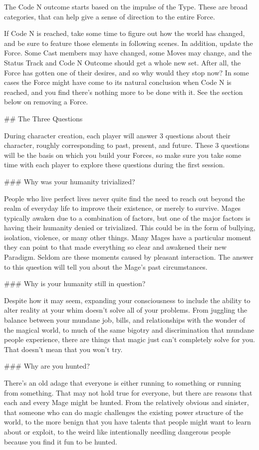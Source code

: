 \documentclass[
  oneside,
  statementpaper,
  9pt]{memoir}
\begin{document}
\begin{MC}
The Code N outcome starts based on the impulse of the Type. These are broad categories, that can help give a sense of direction to the entire Force.

If Code N is reached, take some time to figure out how the world has changed, and be sure to feature those elements in following scenes. In addition, update the Force. Some Cast members may have changed, some Moves may change, and the Status Track and Code N Outcome should get a whole new set. After all, the Force has gotten one of their desires, and so why would they stop now? In some cases the Force might have come to its natural conclusion when Code N is reached, and you find there’s nothing more to be done with it. See the section below on removing a Force.

## The Three Questions

During character creation, each player will answer 3 questions about their character, roughly corresponding to past, present, and future. These 3 questions will be the basis on which you build your Forces, so make sure you take some time with each player to explore these questions during the first session. 

### Why was your humanity trivialized?

People who live perfect lives never quite find the need to reach out beyond the realm of everyday life to improve their existence, or merely to survive. Mages typically awaken due to a combination of factors, but one of the major factors is having their humanity denied or trivialized. This could be in the form of bullying, isolation, violence, or many other things. Many Mages have a particular moment they can point to that made everything so clear and awakened their new Paradigm. Seldom are these moments caused by pleasant interaction. The answer to this question will tell you about the Mage’s past circumstances.

### Why is your humanity still in question?

Despite how it may seem, expanding your consciousness to include the ability to alter reality at your whim doesn’t solve all of your problems. From juggling the balance between your mundane job, bills, and relationships with the wonder of the magical world, to much of the same bigotry and discrimination that mundane people experience, there are things that magic just can’t completely solve for you. That doesn’t mean that you won’t try.

### Why are you hunted?

There’s an old adage that everyone is either running to something or running from something. That may not hold true for everyone, but there are reasons that each and every Mage might be hunted. From the relatively obvious and sinister, that someone who can do magic challenges the existing power structure of the world, to the more benign that you have talents that people might want to learn about or exploit, to the weird like intentionally needling dangerous people because you find it fun to be hunted.


\end{MC}
\end{document}
